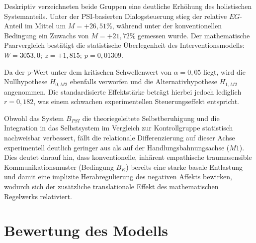 Deskriptiv verzeichneten beide Gruppen eine deutliche Erhöhung des holistischen Systemanteils. Unter der PSI-basierten Dialogsteuerung stieg der relative $EG$-Anteil im Mittel um $M = +26{,}51\%$, während unter der konventionellen Bedingung ein Zuwachs von $M = +21{,}72\%$ gemessen wurde. Der mathematische Paarvergleich bestätigt die statistische Überlegenheit des Interventionsmodells:
\begin{math}
    W = 3053{,}0; \ z = +1{,}815; \ p = 0{,}01309
\end{math}.

Da der p-Wert unter dem kritischen Schwellenwert von $\alpha = 0{,}05$ liegt, wird die Nullhypothese $H_{0, M2}$ ebenfalls verworfen und die Alternativhypothese $H_{1, M2}$ angenommen. Die standardisierte Effektstärke beträgt hierbei jedoch lediglich $r = 0{,}182$, was einem schwachen experimentellen Steuerungseffekt entspricht. 

Obwohl das System $B_{PSI}$ die theoriegeleitete Selbstberuhigung und die Integration in das Selbstsystem im Vergleich zur Kontrollgruppe statistisch nachweisbar verbessert, fällt die relationale Differenzierung auf dieser Achse experimentell deutlich geringer aus als auf der Handlungsbahnungsachse ($M1$). Dies deutet darauf hin, dass konventionelle, inhärent empathische traumasensible Kommunikationsmuster (Bedingung $B_K$) bereits eine starke basale Entlastung und damit eine implizite Herabregulierung des negativen Affekts bewirken, wodurch sich der zusätzliche translationale Effekt des mathematischen Regelwerks relativiert.


\section{Bewertung des Modells}